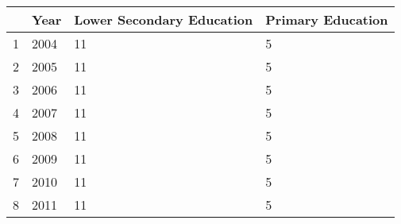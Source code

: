 \begin{tabular}{llll}
\toprule
 & Year  & Lower Secondary Education  & Primary Education  \\
\midrule
1 & 2004  & 11  & 5  \\
2 & 2005  & 11  & 5  \\
3 & 2006  & 11  & 5  \\
4 & 2007  & 11  & 5  \\
5 & 2008  & 11  & 5  \\
6 & 2009  & 11  & 5  \\
7 & 2010  & 11  & 5  \\
8 & 2011  & 11  & 5  \\
\bottomrule
\end{tabular}
